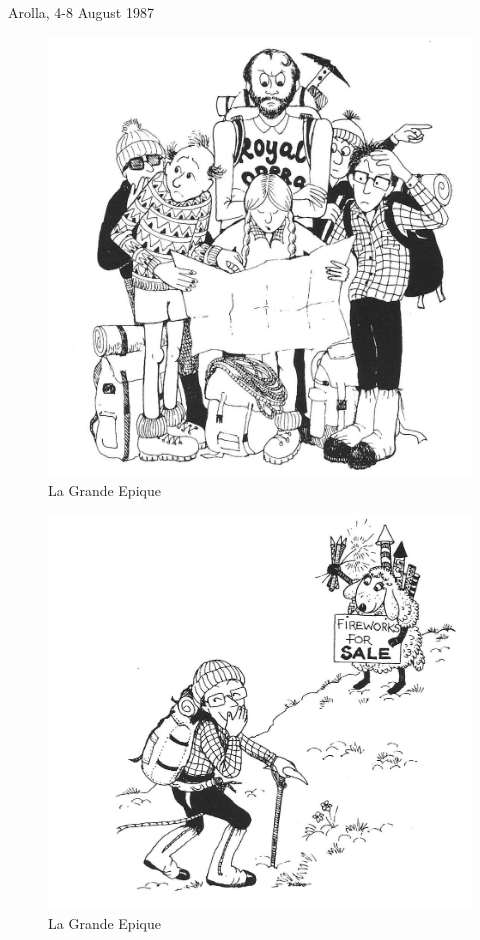 \documentclass[a5paper,openany,font 10pt]{scrbook}
\begin{document}
Arolla, 4-8 August 1987
\begin{figure}[htb]
\centering
\includegraphics[width=.9\linewidth]{./images/Cartoon_11.jpg}
\caption{\label{fig:org37d0ada}
La Grande Epique}
\end{figure}

\begin{figure}[htb]
\centering
\includegraphics[width=.9\linewidth]{./images/Cartoon_12.jpg}
\caption{\label{fig:org98d04a4}
La Grande Epique}
\end{figure}
\end{document}
